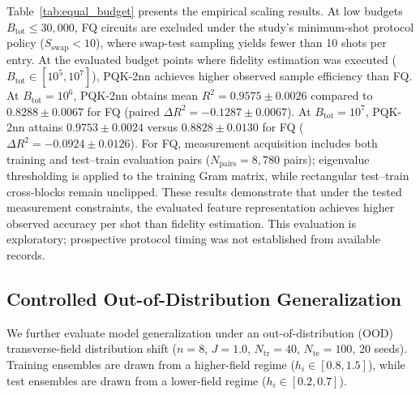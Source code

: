 \documentclass[conference]{IEEEtran}
\begin{document}
Table~\ref{tab:equal_budget} presents the empirical scaling results. At low budgets $B_{\mathrm{tot}} \le 30{,}000$, FQ circuits are excluded under the study's minimum-shot protocol policy ($S_{\mathrm{swap}} < 10$), where swap-test sampling yields fewer than 10 shots per entry. At the evaluated budget points where fidelity estimation was executed ($B_{\mathrm{tot}} \in [10^5, 10^7]$), PQK-2nn achieves higher observed sample efficiency than FQ. At $B_{\mathrm{tot}}=10^6$, PQK-2nn obtains mean $R^2 = 0.9575 \pm 0.0026$ compared to $0.8288 \pm 0.0067$ for FQ (paired $\Delta R^2 = -0.1287 \pm 0.0067$). At $B_{\mathrm{tot}}=10^7$, PQK-2nn attains $0.9753 \pm 0.0024$ versus $0.8828 \pm 0.0130$ for FQ ($\Delta R^2 = -0.0924 \pm 0.0126$). For FQ, measurement acquisition includes both training and test--train evaluation pairs ($N_{\mathrm{pairs}}=8{,}780$ pairs); eigenvalue thresholding is applied to the training Gram matrix, while rectangular test--train cross-blocks remain unclipped. These results demonstrate that under the tested measurement constraints, the evaluated feature representation achieves higher observed accuracy per shot than fidelity estimation. This evaluation is exploratory; prospective protocol timing was not established from available records.



\subsection{Controlled Out-of-Distribution Generalization}
\label{sec:ood}
We further evaluate model generalization under an out-of-distribution (OOD) transverse-field distribution shift ($n=8$, $J=1.0$, $N_{\mathrm{tr}}=40$, $N_{\mathrm{te}}=100$, 20 seeds). Training ensembles are drawn from a higher-field regime ($h_i \in [0.8, 1.5]$), while test ensembles are drawn from a lower-field regime ($h_i \in [0.2, 0.7]$).
\end{document}
